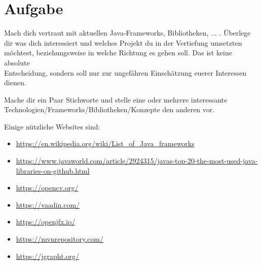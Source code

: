 \documentclass[12pt, oneside]{article}   	%
\begin{document}
\section{Aufgabe}
Mach dich vertraut mit aktuellen Java-Frameworks, Bibliotheken, ... . Überlege dir was dich interessiert und welches Projekt du in der Vertiefung umsetzten möchtest, beziehungsweise in welche Richtung es gehen soll. Das ist keine absolute \\ Entscheidung, sondern soll nur zur ungefähren  Einschätzung euerer Interessen \\ dienen.

\vspace{0.5cm}
Mache dir ein Paar Stichworte und stelle eine oder mehrere interessante \\ Technologien/Frameworks/Bibliotheken/Konzepte den anderen vor. 

\vspace{0.5cm}

Einige nützliche Websites sind:
\begin{itemize}
	\item \url{https://en.wikipedia.org/wiki/List_of_Java_frameworks}
	\item \url{https://www.javaworld.com/article/2924315/javas-top-20-the-most-used-java-libraries-on-github.html}
	\item \url{https://opencv.org/}
	\item \url{https://vaadin.com/}
	\item \url{https://openjfx.io/}
	\item \url{https://mvnrepository.com/}
	\item \url{https://jgrapht.org/}
\end{itemize}
\end{document}
